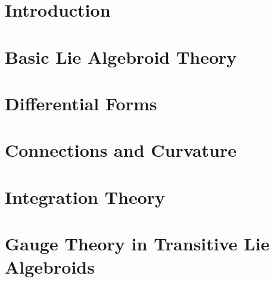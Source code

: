 \documentclass[12pt]{report}
\theoremstyle{definition}
\begin{document}
\setcounter{chapter}{-1}
\chapter{Introduction}\label{chp:intro}
%

\chapter{Basic Lie Algebroid Theory}\label{chp:basicLie}


\chapter{Differential Forms}\label{chp:diffStruc}


\chapter{Connections and Curvature}\label{chp:connections}


\chapter{Integration Theory}\label{chp:integration}


\chapter{Gauge Theory in Transitive Lie Algebroids}\label{chp:gaugeTh}


\normalem

\printbibliography
\end{document}
